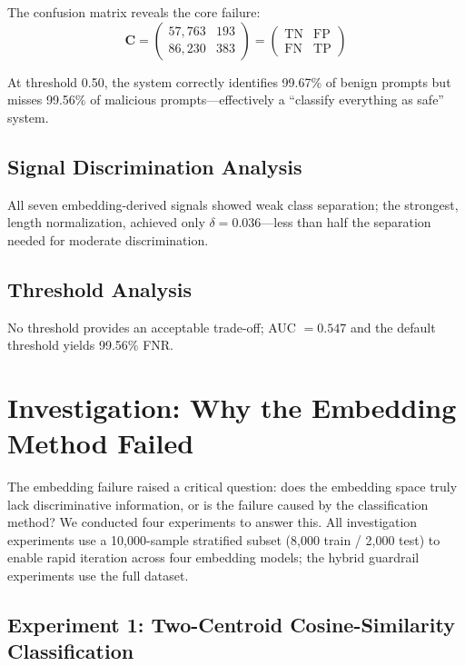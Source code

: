 \documentclass[12pt,a4paper]{article}
\begin{document}
The confusion matrix reveals the core failure:
\begin{equation}
\mathbf{C} = \begin{pmatrix} 57{,}763 & 193 \\ 86{,}230 & 383 \end{pmatrix} = \begin{pmatrix} \text{TN} & \text{FP} \\ \text{FN} & \text{TP} \end{pmatrix}
\end{equation}

At threshold 0.50, the system correctly identifies 99.67\% of benign prompts but misses 99.56\% of malicious prompts---effectively a ``classify everything as safe'' system.

\subsection{Signal Discrimination Analysis}

All seven embedding-derived signals showed weak class separation; the strongest, length normalization, achieved only $\delta = 0.036$---less than half the separation needed for moderate discrimination.

\subsection{Threshold Analysis}

No threshold provides an acceptable trade-off; AUC $= 0.547$ and the default threshold yields 99.56\% FNR.

\section{Investigation: Why the Embedding Method Failed}\label{sec:investigation}

The embedding failure raised a critical question: does the embedding space truly lack discriminative information, or is the failure caused by the classification method? We conducted four experiments to answer this. All investigation experiments use a 10,000-sample stratified subset (8,000 train / 2,000 test) to enable rapid iteration across four embedding models; the hybrid guardrail experiments use the full dataset.

\subsection{Experiment 1: Two-Centroid Cosine-Similarity Classification}
\end{document}
